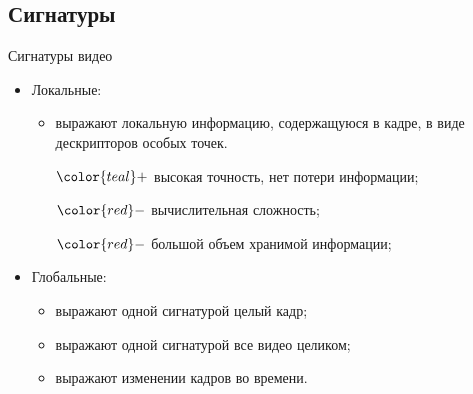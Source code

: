 

\subsection{Сигнатуры}

\begin{frame}{Сигнатуры видео}

    \begin{itemize}
        \item Локальные:
        \begin{itemize}
            \item   выражают локальную информацию, содержащуюся в кадре,
                    в виде дескрипторов особых точек.
            \item[$\color{teal}+$] высокая точность, нет потери информации;
            \item[$\color{red}-$] вычислительная сложность;
            \item[$\color{red}-$] большой объем хранимой информации;
        \end{itemize}
        \item Глобальные:
        \begin{itemize}
            \item   выражают одной сигнатурой целый кадр;
            \item   выражают одной сигнатурой все видео целиком;
            \item   выражают изменении кадров во времени.
        \end{itemize}
    \end{itemize}

\end{frame}




